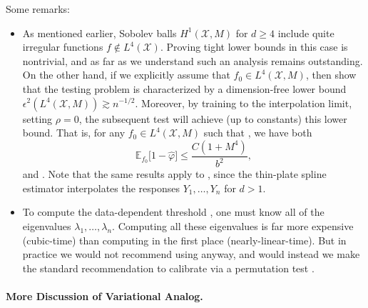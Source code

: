 \documentclass[twoside]{article}
\newcommand{\1}{\mathbf{1}}
\newcommand{\Xset}{\mathcal{X}}
\newcommand{\Leb}{L}
\newcommand{\Ebb}{\mathbb{E}}
\newcommand{\wt}[1]{\widetilde{#1}}
\newcommand{\wh}[1]{\widehat{#1}}
\theoremstyle{definition}
\theoremstyle{remark}
\begin{document}
Some remarks:
\begin{itemize}
	\item As mentioned earlier, Sobolev balls $H^1(\Xset,M)$ for $d \geq 4$ include quite irregular functions $f \not\in \Leb^4(\Xset)$. Proving tight lower bounds in this case is nontrivial, and as far as we understand such an analysis remains outstanding. On the other hand, if we explicitly assume that $f_0 \in \Leb^4(\Xset,M)$, then \citet{guerre02} show that the testing problem is characterized by a dimension-free lower bound $\epsilon^{2}(\Leb^4(\Xset,M)) \gtrsim n^{-1/2}$. Moreover, by training \smash{$\wh{f}$} to the interpolation limit, setting $\rho = 0$, the subsequent test \smash{$\wh{\varphi}$} will achieve (up to constants) this lower bound. That is, for any $f_0 \in \Leb^4(\Xset,M)$ such that \smash{$\|f_0\|_{\Leb^2(\Xset)}^2 \geq C b^2n^{-1/2}$}, we have both
	\begin{equation}
	\label{eqn:laplacian_smoothing_testing_low_smoothness}
	\Ebb_{f_0}\bigl[1 - \wh{\varphi}\bigr] \leq \frac{C(1 + M^4)}{b^2},
	\end{equation} 
	and \smash{$\Ebb_0[\wh{\varphi}] \leq 1/b^2$}. Note that the same results apply to \smash{$\wt{T}$}, since the thin-plate spline estimator \smash{$\wt{f}$} interpolates the responses $Y_1,\ldots,Y_n$ for $d>1$.
	\item To compute the data-dependent threshold \smash{$\wh{t}_b$}, one must know all of the eigenvalues $\lambda_1,\ldots,\lambda_n$. Computing all these eigenvalues is far more expensive (cubic-time) than computing \smash{$\wh{T}$} in the first place (nearly-linear-time). But in practice we would not recommend using \smash{$\wh{t}_b$} anyway, and would instead we make the standard recommendation to calibrate via a permutation test \citep{hoeffding1952}. 
\end{itemize}

\paragraph{More Discussion of Variational Analog.}
\end{document}
